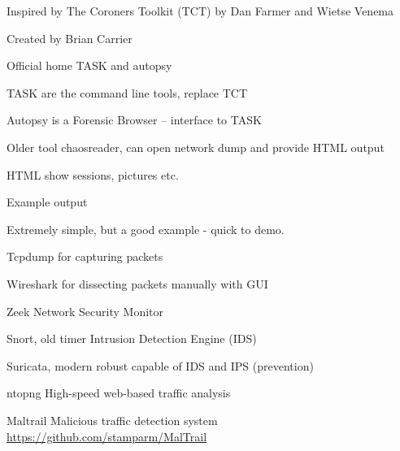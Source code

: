 \documentclass[Screen16to9,17pt]{foils}
\begin{document}


\begin{list1}
\item Inspired by The Coroners Toolkit (TCT) by  Dan Farmer and Wietse Venema
\item Created by Brian Carrier
\item Official home TASK and autopsy 
\item TASK are the command line tools, replace TCT
\item Autopsy is a Forensic Browser -- interface to TASK
\end{list1}




\begin{list1}
\item Older tool chaosreader, can open network dump and provide HTML output
\item HTML show sessions, pictures etc.
\item {}
\item Example output 
\end{list1}

Extremely simple, but a good example - quick to demo.





\begin{list1}
\item Tcpdump for capturing packets
\item Wireshark for dissecting packets manually with GUI
\item Zeek Network Security Monitor
\item Snort, old timer Intrusion Detection Engine (IDS)
\item Suricata, modern robust capable of IDS and IPS (prevention)
\item ntopng High-speed web-based traffic analysis
\item Maltrail Malicious traffic detection system \url{https://github.com/stamparm/MalTrail}
\end{list1}
\end{document}
